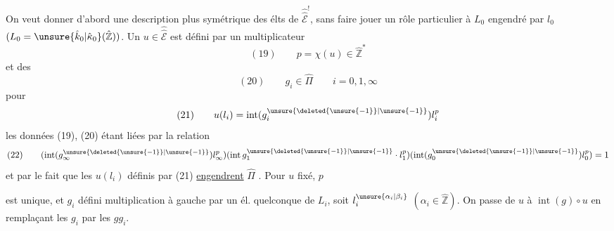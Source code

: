 On veut donner d'abord une description plus symétrique des élts de $\widehat{\widehat{\mathcal E}}^!$, sans faire jouer un rôle particulier à $L_0$ engendré par $l_0$ $(L_0=\unsure{\hat k_0|\hat\kappa_0}(\hat{\mathbb Z}))$. Un $u\in\widehat{\widehat{\mathcal E}}$ est  défini par un multiplicateur
\[
(19)\qquad p=\chi(u)\in\hat{\mathbb Z}^{*}
\]
et des
\[
(20)\qquad g_i\in\hat\Pi\qquad i=0,1,\infty
\]
pour
\[
(21)\qquad u(l_i)=\operatorname{int}(g_i^{\unsure{\deleted{\unsure{-1}}|\unsure{-1}}})l_i^p
\]
les données (19), (20) étant liées par la relation
\[
(22)\qquad(\operatorname{int}(g_\infty^{\unsure{\deleted{\unsure{-1}}|\unsure{-1}}})l_\infty^p)
(\operatorname{int}g_1^{\unsure{\deleted{\unsure{-1}}|\unsure{-1}}}\cdot l_1^p)
(\operatorname{int}(g_0^{\unsure{\deleted{\unsure{-1}}|\unsure{-1}}})l_0^p)=1
\]
et par le fait que les $u(l_i)$ définis par (21) \uline{engendrent} $\hat\Pi$ . Pour $u$ fixé, $p$

est unique, et $g_i$ défini multiplication à gauche par un él. quelconque de $L_i$, soit $l_i^{\unsure{\alpha_i|\beta_i}}$ $(\alpha_i\in\hat{\mathbb Z})$. On passe de $u$ à $\operatorname{int}(g)\circ u$ en  remplaçant les $g_i$ par les $gg_i$.

